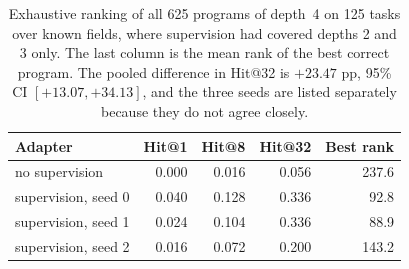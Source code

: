 \begin{table}[!tbh]
\centering\footnotesize\setlength{\tabcolsep}{4pt}
\begin{tabular}{|l|r|r|r|r|}
\hline
\textbf{Adapter} & \textbf{Hit@1} & \textbf{Hit@8} & \textbf{Hit@32} & \textbf{Best rank} \\
\hline
no supervision & 0.000 & 0.016 & 0.056 & 237.6 \\ \hline
supervision, seed 0 & 0.040 & 0.128 & 0.336 & 92.8 \\ \hline
supervision, seed 1 & 0.024 & 0.104 & 0.336 & 88.9 \\ \hline
supervision, seed 2 & 0.016 & 0.072 & 0.200 & 143.2 \\ \hline
\end{tabular}
\caption{Exhaustive ranking of all 625 programs of depth~4 on 125 tasks over known
fields, where supervision had covered depths 2 and 3 only. The last column is the
mean rank of the best correct program. The pooled difference in Hit@32 is $+23.47$
pp, 95\% CI $[+13.07, +34.13]$, and the three seeds are listed separately because
they do not agree closely.}
\label{tab:depth4}
\end{table}
